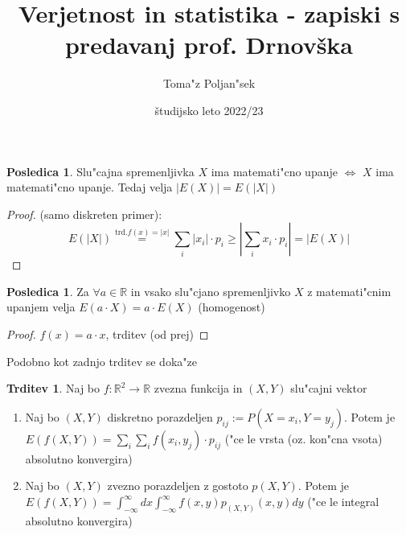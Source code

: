 \documentclass[a4paper,12pt]{article}
\theoremstyle{definition}
\newtheorem{conseq}[counter]{Posledica}
\newtheorem{claim}[counter]{Trditev}
\theoremstyle{remark}
\newcommand{\R}{\mathbb{R}}
\begin{document}
\title{Verjetnost in statistika - zapiski s predavanj prof. Drnovška}
\author{
	Toma"z Poljan"sek
}
\date{študijsko leto 2022/23}
\maketitle


\tableofcontents
\newpage
{}





\begin{conseq}
    Slu"cajna spremenljivka $X$ ima matemati"cno upanje $\iff$ $X$ ima matemati"cno upanje. Tedaj velja
    $|E(X)| = E(|X|)$
\end{conseq}

\begin{proof}
    (samo diskreten primer): \\
    \begin{equation*}
        E(|X|) \stackrel{\text{trd.} f(x)=|x|}{=} \sum_i |x_i| \cdot p_i \geq |\sum_i x_i \cdot p_i| = |E(X)|
    \end{equation*}
\end{proof}

\begin{conseq}
    Za $\forall a \in \R$ in vsako slu"cjano spremenljivko $X$ z matemati"cnim upanjem velja $E(a \cdot X) = a \cdot E(X)$
    (homogenost)
\end{conseq}

\begin{proof}
    $f(x) = a \cdot x$, trditev (od prej)
\end{proof}

Podobno kot zadnjo trditev se doka"ze

\begin{claim}
    Naj bo $f: \R^2 \to \R$ zvezna funkcija in $(X,Y)$ slu"cajni vektor
    \begin{enumerate}[label=(\alph*)]
        \item Naj bo $(X,Y)$ diskretno porazdeljen $p_{ij} := P(X=x_i, Y=y_j)$. Potem je $E(f(X,Y)) = \sum_i \sum_i
            f(x_i,y_j) \cdot p_{ij}$ ("ce le vrsta (oz. kon"cna vsota) absolutno konvergira)
        \item Naj bo $(X,Y)$ zvezno porazdeljen z gostoto $p(X,Y)$. Potem je $E(f(X,Y)) = \int_{-\infty}^{\infty} dx
            \int_{-\infty}^{\infty} f(x,y) p_{(X,Y)}(x,y) dy$ ("ce le integral absolutno konvergira)
    \end{enumerate}
\end{claim}
\end{document}

